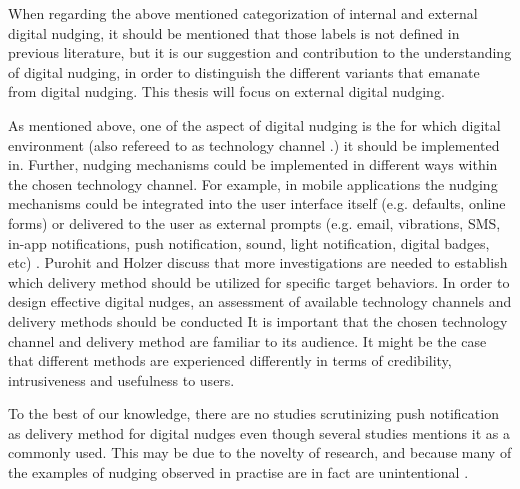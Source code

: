 When regarding the above mentioned categorization of internal and external digital nudging, it should be mentioned that those labels is not defined in previous literature, but it is our suggestion and contribution to the understanding of digital nudging, in order to distinguish the different variants that emanate from digital nudging. This thesis will focus on external digital nudging. 

\bigbreak
 As mentioned above, one of the aspect of digital nudging is the for which digital environment (also refereed to as technology channel \cite{mirsch_making_2018}.) it should be implemented in. Further, nudging mechanisms could be implemented in different ways within the chosen technology channel. For example, in mobile applications the nudging mechanisms could be integrated into the user interface itself (e.g. defaults, online forms) or delivered to the user as external prompts (e.g. email, vibrations, SMS, in-app notifications, push notification, sound, light notification, digital badges, etc) \cite{purohit_functional_2019}.
Purohit and Holzer \cite{purohit_functional_2019}
discuss that more investigations are needed to establish which delivery method should be utilized for specific target behaviors. In order to design effective digital nudges, an assessment of available technology channels and delivery methods should be conducted\cite{mirsch_making_2018}
It is important that the chosen technology channel and delivery method are familiar to its audience. It might be the case that different methods are experienced differently in terms of credibility, intrusiveness and usefulness to users. %


To the best of our knowledge, there are no studies scrutinizing push notification as delivery method for digital nudges even though several studies mentions it as a commonly used\cite{dhar_persuasive_2017}. This may be due to the novelty of research, and because many of the examples of nudging observed in practise are in fact are unintentional \cite{mirsch_digital_2017}. 


